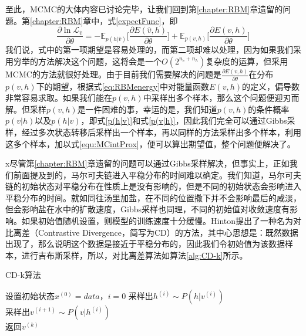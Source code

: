 至此，MCMC的大体内容已讨论完毕，让我们回到第\ref{chapter:RBM}章遗留的问题。第\ref{chapter:RBM}章中，式\eqref{expectFunc}，即
\begin{equation}
 \frac{\partial\ln\mathcal{L}_{\hat{v}} }{\partial\theta} =  
 -\mathbb{E}_{p(h|\hat{v})}\bigg[ \frac{\partial E(\hat{v}, h)}{\partial \theta} \bigg]
 + \mathbb{E}_{p(v, h)}\bigg[\frac{\partial E(v, h)}{\partial \theta}\bigg]
\end{equation}
我们说，式中的第一项期望是容易处理的，而第二项却难以处理，因为如果我们采用穷举的方法解决这个问题，这将会是一个$O(2^{n_v+n_h})$复杂度的运算，但采用MCMC的方法就很好处理。由于目前我们需要解决的问题是$\frac{\partial E(v, h)}{\partial \theta}$在分布$p(v, h)$下的期望，根据式\eqref{eq:RBMenergy}中对能量函数$E(v,h)$的定义，偏导数非常容易求取。如果我们能在$p(v, h)$中采样出多个样本，那么这个问题便迎刃而解。但采样$p(v,h)$是一件困难的事，幸运的是，我们知道$p(v,h)$的条件概率$p(v|h)$以及$p(h|v)$，即式\eqref{p(h|v)}和式\eqref{p(v|h)}，因此我们完全可以通过Gibbs采样，经过多次状态转移后采样出一个样本，再以同样的方法采样出多个样本，利用这多个样本，加以式\eqref{equ:MCintProx}，便可以算出期望值，整个问题便解决了。

x尽管第\ref{chapter:RBM}章遗留的问题可以通过Gibbs采样解决，但事实上，正如我们前面提及到的，马尔可夫链进入平稳分布的时间难以确定。我们知道，马尔可夫链的初始状态对平稳分布在性质上是没有影响的，但是不同的初始状态会影响进入平稳分布的时间。就如同往汤里加盐，在不同的位置撒下并不会影响最后的咸淡，但会影响盐在水中的扩散速度，Gibbs采样也同理，不同的初始值对收敛速度有影响。如果初始值随机设置，则模型的训练速度十分缓慢。Hinton提出了一种名为对比离差（Contrastive Divergence，简写为CD）的方法，其中心思想是：既然数据出现了，那么说明这个数据是接近于平稳分布的，因此我们令初始值为该数据样本，进行吉布斯采样，所以，对比离差算法如算法\ref{alg:CD-k}所示。

\vspace{1em}
\begin{minipage}{0.8\textwidth}\centering
\begin{algorithm}[H]\label{alg:CD-k}
 \caption{CD-k算法}
设置初始状态$x^{(0)}=data$，$i=0$\;
{
采样出$h^{(i)} \sim P(h|v^{(i)})$\\
采样出$v^{(i+1)} \sim P(v|h^{(i)})$\\
}
返回$v^{(k)}$
\end{algorithm}
\end{minipage}
\vspace{1em}

